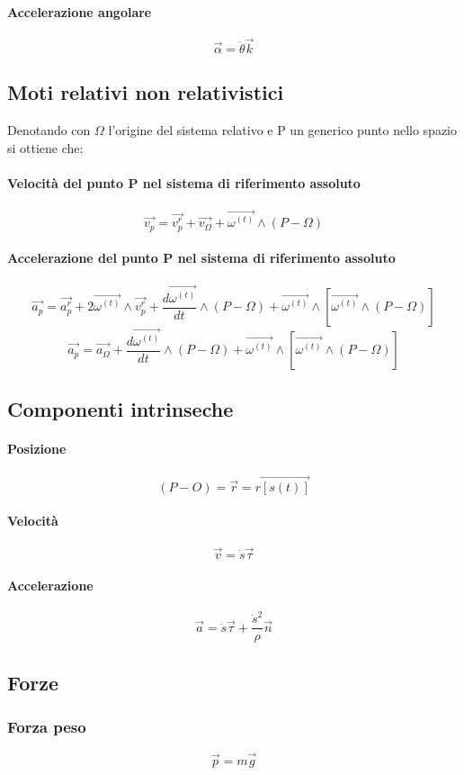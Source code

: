\documentclass[12pt,a4paper]{report}
\begin{document}
			\paragraph{Accelerazione angolare}
			\[\vec{\alpha}=\ddot{\theta}\vec{k}\]
	\subsection{Moti relativi non relativistici}
	Denotando con $\Omega$ l'origine del sistema relativo e P un generico punto nello spazio si ottiene che:
		\paragraph{Velocità del punto P nel sistema di riferimento assoluto}	
			\[\vec{v_{p}} = \vec{v_{p}^{r}} +\vec{v_{\Omega}}+\vec{\omega^{(t)}}\wedge(P-\Omega)\]
		\paragraph{Accelerazione del punto P nel sistema di riferimento assoluto}
		\[\vec{a_{p}} = \vec{a_{p}^{r}}+2\vec{\omega^{(t)}}\wedge\vec{v_{p}^{r}} + \frac{d\vec{\omega^{(t)}}}{dt} \wedge (P-\Omega) + \vec{\omega^{(t)}} \wedge [\vec{\omega^{(t)}} \wedge (P-\Omega)] \]
		\[\vec{a_{p}} = \vec{a_{\Omega}} + \frac{d\vec{\omega^{(t)}}}{dt} \wedge (P-\Omega) + \vec{\omega^{(t)}} \wedge [\vec{\omega^{(t)}} \wedge (P-\Omega)] \]

	\subsection{Componenti intrinseche}
			\paragraph{Posizione}	
			\[(P-O)= \vec{r} = \vec{r[s(t)]}\]
			\paragraph{Velocità}	
			\[\vec{v}=\dot{s}\vec{\tau}\]
			\paragraph{Accelerazione}
			\[\vec{a} = \ddot{s}\vec{\tau} + \frac{\dot{s}^{2}}{\rho} \vec{n} \]
	\subsection{Forze}
	\subsubsection{Forza peso}
	\[\vec{p}=m\vec{g}\]
\end{document}

